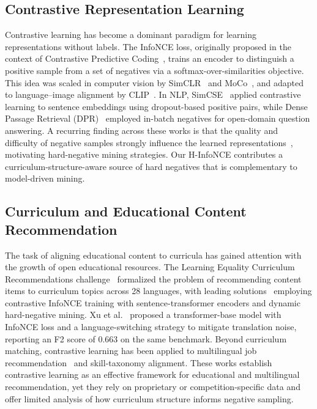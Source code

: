 \documentclass[applsci,article,submit,pdftex,moreauthors]{Definitions/mdpi}
\begin{document}
\subsection{Contrastive Representation Learning}

Contrastive learning has become a dominant paradigm for learning representations without labels. The InfoNCE loss, originally proposed in the context of Contrastive Predictive Coding~\cite{oord2018cpc}, trains an encoder to distinguish a positive sample from a set of negatives via a softmax-over-similarities objective. This idea was scaled in computer vision by SimCLR~\cite{chen2020simclr} and MoCo~\cite{he2020moco}, and adapted to language--image alignment by CLIP~\cite{radford2021clip}. In NLP, SimCSE~\cite{gao2021simcse} applied contrastive learning to sentence embeddings using dropout-based positive pairs, while Dense Passage Retrieval (DPR)~\cite{karpukhin2020dpr} employed in-batch negatives for open-domain question answering. A recurring finding across these works is that the quality and difficulty of negative samples strongly influence the learned representations~\cite{robinson2021hard}, motivating hard-negative mining strategies. Our H-InfoNCE contributes a curriculum-structure-aware source of hard negatives that is complementary to model-driven mining.

\subsection{Curriculum and Educational Content Recommendation}

The task of aligning educational content to curricula has gained attention with the growth of open educational resources. The Learning Equality Curriculum Recommendations challenge~\cite{lecr-kaggle} formalized the problem of recommending content items to curriculum topics across 28 languages, with leading solutions~\cite{habel2023} employing contrastive InfoNCE training with sentence-transformer encoders and dynamic hard-negative mining. Xu et al.~\cite{xu2024curriculum} proposed a transformer-base model with InfoNCE loss and a language-switching strategy to mitigate translation noise, reporting an F2 score of 0.663 on the same benchmark. Beyond curriculum matching, contrastive learning has been applied to multilingual job recommendation~\cite{deniz2024multilingual} and skill-taxonomy alignment. These works establish contrastive learning as an effective framework for educational and multilingual recommendation, yet they rely on proprietary or competition-specific data and offer limited analysis of how curriculum structure informs negative sampling.
\end{document}
